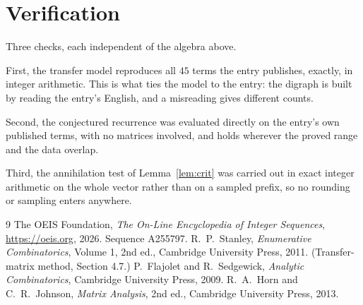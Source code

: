 \documentclass[11pt,a4paper]{article}
\theoremstyle{plain}
\theoremstyle{definition}
\begin{document}
\section{Verification}

Three checks, each independent of the algebra above.

First, the transfer model reproduces all $45$ terms the entry publishes, exactly, in
integer arithmetic. This is what ties the model to the entry: the digraph is built by reading
the entry's English, and a misreading gives different counts.

Second, the conjectured recurrence was evaluated directly on the entry's own published terms,
with no matrices involved, and holds wherever the proved range and the data overlap.

Third, the annihilation test of Lemma~\ref{lem:crit} was carried out in exact integer
arithmetic on the whole vector rather than on a sampled prefix, so no rounding or sampling
enters anywhere.

\begin{thebibliography}{9}
 The OEIS Foundation, \emph{The On-Line Encyclopedia of Integer
Sequences}, \url{https://oeis.org}, 2026. Sequence A255797.
 R.~P.~Stanley, \emph{Enumerative Combinatorics}, Volume 1, 2nd ed.,
Cambridge University Press, 2011. (Transfer-matrix method, Section 4.7.)
 P.~Flajolet and R.~Sedgewick, \emph{Analytic Combinatorics}, Cambridge
University Press, 2009.
 R.~A.~Horn and C.~R.~Johnson, \emph{Matrix Analysis}, 2nd ed., Cambridge
University Press, 2013.
\end{thebibliography}
\end{document}
